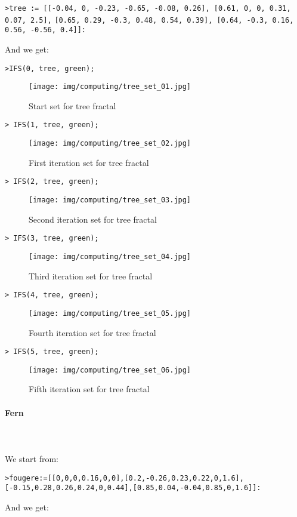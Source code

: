 	\texttt{>tree := [[-0.04, 0, -0.23, -0.65, -0.08, 0.26], [0.61, 0, 0, 0.31, 0.07, 2.5],}
	\texttt{[0.65, 0.29, -0.3, 0.48, 0.54, 0.39], [0.64, -0.3, 0.16, 0.56, -0.56, 0.4]]:}

	And we get:
	
	\texttt{>IFS(0, tree, green);}
	\begin{figure}[H]
		\centering
		\texttt{[image: img/computing/tree\_set\_01.jpg]}
		\caption[]{Start set for tree fractal}
	\end{figure}
	\texttt{> IFS(1, tree, green);}
	\begin{figure}[H]
		\centering
		\texttt{[image: img/computing/tree\_set\_02.jpg]}
		\caption[]{First iteration set for tree fractal}
	\end{figure}
	\texttt{> IFS(2, tree, green);}
	\begin{figure}[H]
		\centering
		\texttt{[image: img/computing/tree\_set\_03.jpg]}
		\caption[]{Second iteration set for tree fractal}
	\end{figure}
	\texttt{> IFS(3, tree, green);}
	\begin{figure}[H]
		\centering
		\texttt{[image: img/computing/tree\_set\_04.jpg]}
		\caption[]{Third iteration set for tree fractal}
	\end{figure}
	\texttt{> IFS(4, tree, green);}
	\begin{figure}[H]
		\centering
		\texttt{[image: img/computing/tree\_set\_05.jpg]}
		\caption[]{Fourth iteration set for tree fractal}
	\end{figure}
	\texttt{> IFS(5, tree, green);}
	\begin{figure}[H]
		\centering
		\texttt{[image: img/computing/tree\_set\_06.jpg]}
		\caption[]{Fifth iteration set for tree fractal}
	\end{figure}
	
	\pagebreak
	\paragraph{Fern}\mbox{}\\\\
	We start from:
	
	\texttt{>fougere:=[[0,0,0,0.16,0,0],[0.2,-0.26,0.23,0.22,0,1.6],}
	\texttt{[-0.15,0.28,0.26,0.24,0,0.44],[0.85,0.04,-0.04,0.85,0,1.6]]:}

	And we get:
	
